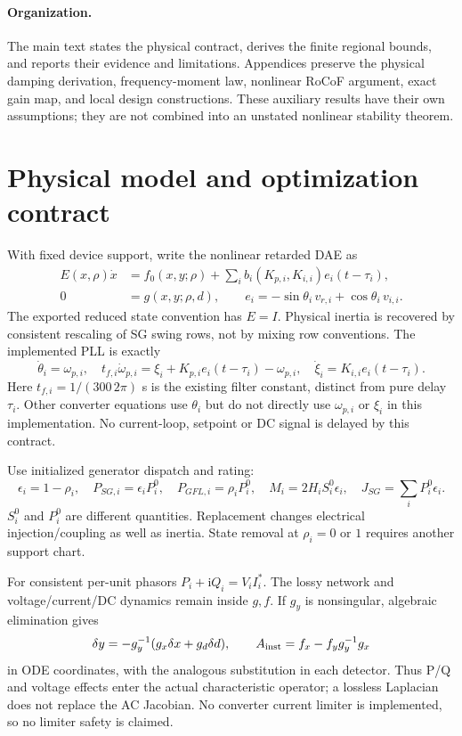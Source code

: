 \documentclass[11pt]{article}
\newcommand{\ii}{\mathrm{i}}
\begin{document}
\paragraph{Organization.}
The main text states the physical contract, derives the finite
regional bounds, and reports their evidence and limitations.
Appendices preserve the physical damping derivation, frequency-moment
law, nonlinear RoCoF argument, exact gain map, and local design
constructions. These auxiliary results have their own assumptions;
they are not combined into an unstated nonlinear stability theorem.
\section{Physical model and optimization contract}\label{sec:model}
With fixed device support, write the nonlinear retarded DAE as
\begin{align}
 E(x,\rho)\dot x&=f_0(x,y;\rho)+\sum_i b_i(K_{p,i},K_{i,i})e_i(t-\tau_i),\\
 0&=g(x,y;\rho,d),\qquad
 e_i=-\sin\theta_i\,v_{r,i}+\cos\theta_i\,v_{i,i}. \label{eq:dae}
\end{align}
The exported reduced state convention has $E=I$. Physical inertia is
recovered by consistent rescaling of SG swing rows, not by mixing row
conventions. The implemented PLL is exactly
\begin{equation}
 \dot\theta_i=\omega_{p,i},\quad
 t_{f,i}\dot\omega_{p,i}=\xi_i+K_{p,i}e_i(t-\tau_i)-\omega_{p,i},
 \quad \dot\xi_i=K_{i,i}e_i(t-\tau_i). \label{eq:pll}
\end{equation}
Here $t_{f,i}=1/(300\,2\pi)$ s is the existing filter constant, distinct
from pure delay $\tau_i$. Other converter equations use $\theta_i$ but
do not directly use $\omega_{p,i}$ or $\xi_i$ in this implementation.
No current-loop, setpoint or DC signal is delayed by this contract.

Use initialized generator dispatch and rating:
\[
 \epsilon_i=1-\rho_i,\quad P_{SG,i}=\epsilon_iP_i^0,\quad
 P_{GFL,i}=\rho_iP_i^0,\quad M_i=2H_iS_i^0\epsilon_i,\quad
 J_{SG}=\sum_iP_i^0\epsilon_i .
\]
$S_i^0$ and $P_i^0$ are different quantities. Replacement changes
electrical injection/coupling as well as inertia. State removal at
$\rho_i=0$ or $1$ requires another support chart.

For consistent per-unit phasors $P_i+\ii Q_i=V_iI_i^*$.
The lossy network and voltage/current/DC dynamics remain inside $g,f$.
If $g_y$ is nonsingular, algebraic elimination gives
\[
 \delta y=-g_y^{-1}(g_x\delta x+g_d\delta d),\qquad
 A_{\rm inst}=f_x-f_yg_y^{-1}g_x
\]
in ODE coordinates, with the analogous substitution in each detector.
Thus P/Q and voltage effects enter the actual characteristic operator;
a lossless Laplacian does not replace the AC Jacobian.
No converter current limiter is implemented, so no limiter safety is claimed.
\end{document}
